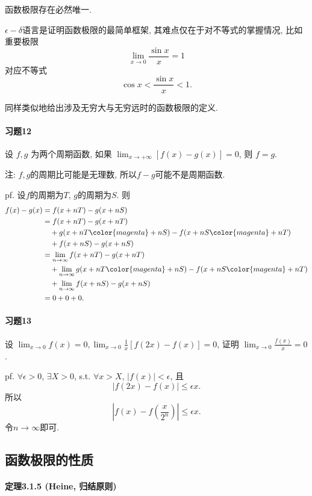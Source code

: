 函数极限存在必然唯一.

$\epsilon-\delta$语言是证明函数极限的最简单框架, 其难点仅在于对不等式的掌握情况, 比如重要极限
\[
\lim_{x\to0}\frac{\sin x}{x}=1
\]
对应不等式
\[
\cos x<\frac{\sin x}{x}<1.
\]

同样类似地给出涉及无穷大与无穷远时的函数极限的定义.

\paragraph{习题12}

设 $f,g$ 为两个周期函数, 如果 $\lim_{x\rightarrow+\infty}[f(x)-g(x)]=0$, 则
$f=g$. 

注: $f,g$的周期比可能是无理数, 所以$f-g$可能不是周期函数.

pf. 设$f$的周期为$T$, $g$的周期为$S$. 则
\begin{align*}
f(x)-g(x) & =f(x+nT)-g(x+nS)\\
 & =f(x+nT)-g(x+nT)\\
 & \quad+g(x+nT{\color{magenta}+nS})-f(x+nS{\color{magenta}+nT})\\
 & \quad+f(x+nS)-g(x+nS)\\
 & =\lim_{n\to\infty}f(x+nT)-g(x+nT)\\
 & \quad+\lim_{n\to\infty}g(x+nT{\color{magenta}+nS})-f(x+nS{\color{magenta}+nT})\\
 & \quad+\lim_{n\to\infty}f(x+nS)-g(x+nS)\\
 & =0+0+0.
\end{align*}


\paragraph{习题13}

设 $\lim_{x\rightarrow0}f(x)=0,\lim_{x\rightarrow0}\frac{1}{x}[f(2x)-f(x)]=0$,
证明 $\lim_{x\rightarrow0}\frac{f(x)}{x}=0$.

pf. $\forall\epsilon>0$, $\exists X>0$, s.t. $\forall x>X$, $\left|f(x)\right|<\epsilon$,
且
\[
\left|f(2x)-f(x)\right|\le\epsilon x.
\]
所以
\[
\left|f(x)-f\left(\frac{x}{2^{n}}\right)\right|\le\epsilon x.
\]
令$n\to\infty$即可.

\subsection{函数极限的性质}

\paragraph{定理3.1.5 (Heine, 归结原则)}

